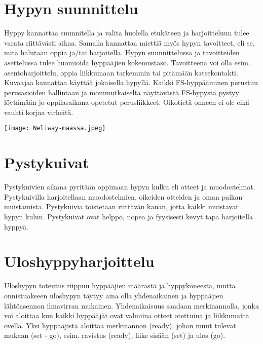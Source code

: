 \section{ Hypyn suunnittelu }
\label{hypyn-lapikayminen-maassa-hypyn-suunnittelu}


Hyppy kannattaa suunnitella ja valita huolella etukäteen ja harjoitteluun tulee varata riittävästi aikaa. Samalla kannattaa miettiä myös hypyn tavoitteet, eli se, mitä halutaan oppia ja/tai harjoitella. Hypyn suunnittelussa ja tavoitteiden asettelussa tulee huomioida hyppääjien kokemustaso. Tavoitteena voi olla esim. asentoharjoittelu, oppia liikkumaan tarkemmin tai pitämään katsekontakti. Kuvaajaa kannattaa käyttää jokaisella hypyllä. Kaikki FS-hyppääminen perustuu perusasioiden hallintaan ja monimutkaiselta näyttävästä FS-hypystä pystyy löytämään jo oppilasaikana opetetut perusliikkeet. Oikotietä onneen ei ole eikä vauhti korjaa virheitä. 


\begin{Figure}\centering\texttt{[image: Neliway-maassa.jpeg]}\end{Figure} 

\section{ Pystykuivat }
\label{hypyn-lapikayminen-maassa-pystykuivat}


Pystykuivien aikana pyritään oppimaan hypyn kulku eli otteet ja muodostelmat. Pystykuivilla harjoitellaan muodostelmien, oikeiden otteiden ja oman paikan muistamista. Pystykuivia toistetaan riittävän kauan, jotta kaikki muistavat hypyn kulun. Pystykuivat ovat helppo, nopea ja fyysisesti kevyt tapa harjoitella hyppyä. 

\section{ Uloshyppyharjoittelu }
\label{hypyn-lapikayminen-maassa-uloshyppyharjoittelu}


Uloshypyn toteutus riippuu hyppääjien määrästä ja hyppykoneesta, mutta onnistuakseen uloshypyn täytyy aina olla yhdenaikainen ja hyppääjien lähtöasennon ilmavirran mukainen. Yhdenaikaisuus saadaan merkinannolla, jonka voi aloittaa kun kaikki hyppääjät ovat valmiina otteet otettuina ja liikkumatta ovella. Yksi hyppääjistä aloittaa merkinannon (ready), johon muut tulevat mukaan (set - go), esim. ravistus (ready), liike sisään (set) ja ulos (go). 


